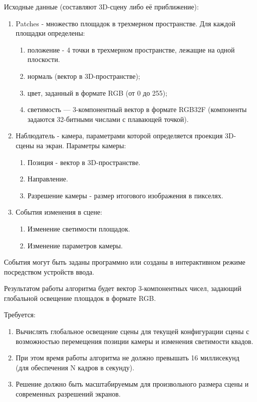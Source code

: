 \documentclass[oneside,final,12pt, a4paper]{extreport}
\begin{document}
Исходные данные (составляют 3D-сцену либо её приближение):

\begin{enumerate}
	\item Patches - множество площадок в трехмерном пространстве. Для каждой площадки определены: 
	\begin{enumerate}
		\item положение - 4 точки в трехмерном пространстве, лежащие на одной плоскости.
		\item нормаль (вектор в 3D-пространстве);
		\item цвет, заданный в формате RGB (от 0 до 255);
		\item светимость --- 3-компонентный вектор в формате RGB32F (компоненты задаются 32-битными числами с плавающей точкой).
	\end{enumerate}
	\item Наблюдатель - камера, параметрами которой определяется проекция 3D-сцены на экран. Параметры камеры:
	\begin{enumerate}
		\item Позиция - вектор в 3D-пространстве.
		\item Направление.
		\item Разрешение камеры - размер итогового изображения в пикселях.
	\end{enumerate}
	\item События изменения в сцене:
	\begin{enumerate}
		\item Изменение светимости площадок.
		\item Изменение параметров камеры.
	\end{enumerate}
\end{enumerate}

События могут быть заданы программно или созданы в интерактивном режиме посредством устройств ввода.

Результатом работы алгоритма будет вектор 3-компонентных чисел, задающий глобальной освещение площадок в формате RGB.

Требуется:
\begin{enumerate}
	\item Вычислять глобальное освещение сцены для текущей конфигурации сцены с возможностью перемещения позиции камеры и изменения светимости квадов. 
	\item При этом время работы алгоритма не должно превышать 16 миллисекунд (для обеспечения N кадров в секунду). 
	\item Решение должно быть масштабируемым для произвольного размера сцены и современных разрешений экранов.
\end{enumerate}
\end{document}
